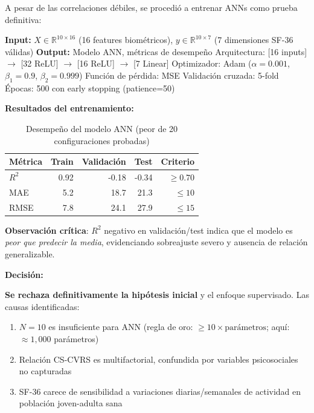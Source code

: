 \documentclass[12pt,letterpaper,twoside]{report}
\newcommand{\R}{\mathbb{R}}
\begin{document}
A pesar de las correlaciones débiles, se procedió a entrenar ANNs como prueba definitiva:

\begin{algorithm}[H]
\caption{Entrenamiento de ANN para CVRS}
\label{alg:ann_training}
\begin{algorithmic}[1]
\State \textbf{Input:} $X \in \R^{10 \times 16}$ (16 features biométricos), $y \in \R^{10 \times 7}$ (7 dimensiones SF-36 válidas)
\State \textbf{Output:} Modelo ANN, métricas de desempeño
\State
\State Arquitectura: [16 inputs] $\to$ [32 ReLU] $\to$ [16 ReLU] $\to$ [7 Linear]
\State Optimizador: Adam ($\alpha=0.001$, $\beta_1=0.9$, $\beta_2=0.999$)
\State Función de pérdida: MSE
\State Validación cruzada: 5-fold
\State Épocas: 500 con early stopping (patience=50)
\end{algorithmic}
\end{algorithm}

\begin{calculobox}
\textbf{Resultados del entrenamiento:}

\begin{table}[H]
\centering
\begin{tabular}{@{}lrrrr@{}}
\toprule
\textbf{Métrica} & \textbf{Train} & \textbf{Validación} & \textbf{Test} & \textbf{Criterio} \\
\midrule
$R^2$            & 0.92  & -0.18 & -0.34 & $\geq 0.70$ \\
MAE              & 5.2   & 18.7  & 21.3  & $\leq 10$ \\
RMSE             & 7.8   & 24.1  & 27.9  & $\leq 15$ \\
\bottomrule
\end{tabular}
\caption{Desempeño del modelo ANN (peor de 20 configuraciones probadas)}
\label{tab:ann_results}
\end{table}

\textbf{Observación crítica}: $R^2$ negativo en validación/test indica que el modelo es \textit{peor que predecir la media}, evidenciando sobreajuste severo y ausencia de relación generalizable.
\end{calculobox}

\begin{decisionbox}
\textbf{Decisión:}

\textbf{Se rechaza definitivamente la hipótesis inicial} y el enfoque supervisado. Las causas identificadas:
\begin{enumerate}[noitemsep]
    \item $N=10$ es insuficiente para ANN (regla de oro: $\geq 10 \times \text{parámetros}$; aquí: $\approx 1,000$ parámetros)
    \item Relación CS-CVRS es multifactorial, confundida por variables psicosociales no capturadas
    \item SF-36 carece de sensibilidad a variaciones diarias/semanales de actividad en población joven-adulta sana
\end{enumerate}
\end{decisionbox}
\end{document}
